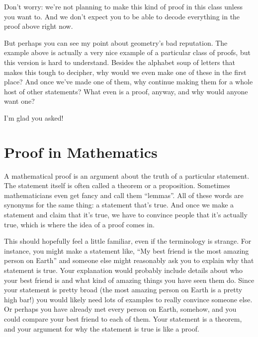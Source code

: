 \documentclass{ximera}
\begin{document}
Don't worry: we're not planning to make this kind of proof in this class unless you want to. And we don't expect you to be able to decode everything in the proof above right now. 

But perhaps you can see my point about geometry's bad reputation. The example above is actually a very nice example of a particular class of proofs, but this version is hard to understand.  Besides the alphabet soup of letters that makes this tough to decipher, why would we even make one of these in the first place? And once we've made one of them, why continue making them for a whole host of other statements? What even is a proof, anyway, and why would anyone want one? 

I'm glad you asked!

\section{Proof in Mathematics}

A mathematical proof is an argument about the truth of a particular statement. The statement itself is often called a theorem or a proposition. Sometimes mathematicians even get fancy and call them ``lemmas''. All of these words are synonyms for the same thing: a statement that's true. And once we make a statement and claim that it's true, we have to convince people that it's actually true, which is where the idea of a proof comes in. 

This should hopefully feel a little familiar, even if the terminology is strange. For instance, you might make a statement like, ``My best friend is the most amazing person on Earth'' and someone else might reasonably ask you to explain why that statement is true. Your explanation would probably include details about who your best friend is and what kind of amazing things you have seen them do. Since your statement is pretty broad (the most amazing person on Earth is a pretty high bar!) you would likely need lots of examples to really convince someone else. Or perhaps you have already met every person on Earth, somehow, and you could compare your best friend to each of them. Your statement is a theorem, and your argument for why the statement is true is like a proof.
\end{document}
